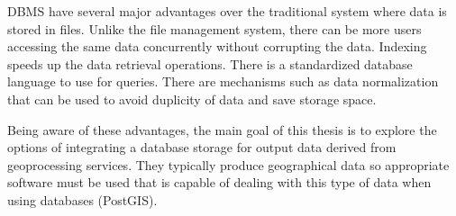 	DBMS have several major advantages over the traditional system where data is stored in files. Unlike the file management system, there can be more users accessing the same data concurrently without corrupting the data. Indexing speeds up the data retrieval operations. There is a standardized database language to use for queries. There are mechanisms such as data normalization that can be used to avoid duplicity of data and save storage space.
	
	Being aware of these advantages, the main goal of this thesis is to explore the options of integrating a database storage for output data derived from geoprocessing services. They typically produce geographical data so appropriate software must be used that is capable of dealing with this type of data when using databases (PostGIS).  

